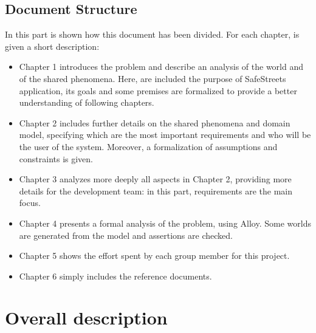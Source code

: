 \documentclass{article}
\begin{document}
		\subsection{Document Structure}
			In this part is shown how this document has been divided. For each chapter, is given a short description:
			\begin{itemize}
				\item Chapter 1 introduces the problem and describe an analysis of the world and of the shared phenomena. Here, are included the purpose of SafeStreets application, its goals and some premises are formalized to provide a better understanding of following chapters.
				\item Chapter 2 includes further details on the shared phenomena and domain model, specifying which are the most important requirements and who will be the user of the system. Moreover, a formalization of assumptions and constraints is given.
				\item Chapter 3 analyzes more deeply all aspects in Chapter 2, providing more details for the development team: in this part, requirements are the main focus.
				\item Chapter 4 presents a formal analysis of the problem, using Alloy. Some worlds are generated from the model and assertions are checked.
				\item Chapter 5 shows the effort spent by each group member for this project.
				\item Chapter 6 simply includes the reference documents.
			\end{itemize}
	
	\newpage










	\section{Overall description}
\end{document}

